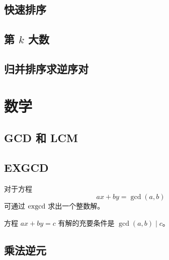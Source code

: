 \documentclass{probook}
\begin{document}
\begin{multicols}{2}




\section{快速排序}



\section{\texorpdfstring{第 $k$ 大数}{第 k 大数}}



\section{归并排序求逆序对}









\chapter{数学}

\section{GCD 和 LCM}



\section{EXGCD}

对于方程 
\[ax+by=\gcd(a,b)\]
可通过 $\rm exgcd$ 求出一个整数解。



方程 $ax+by=c$ 有解的充要条件是 $\gcd(a,b) \mid c$。



\section{乘法逆元}


\end{multicols}
\end{document}
